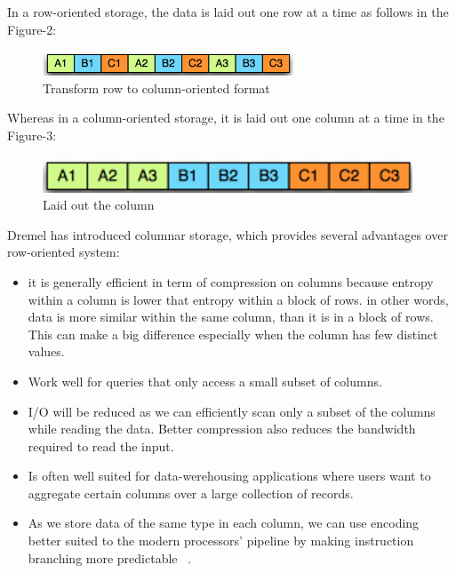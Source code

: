 \documentclass[9pt,twocolumn,twoside]{../../styles/osajnl}
\begin{document}
In a row-oriented storage, the data is laid out one row at a time as follows in the Figure-2:


\begin{figure}[H]
 \centering
\includegraphics[scale=0.7]{images/image2}
\caption{Transform row to column-oriented format}
\end{figure}

Whereas in a column-oriented storage, it is laid out one column at a time in the Figure-3:

\begin{figure}[H]
 \centering
\includegraphics[scale=0.7]{images/image3}
\caption{Laid out the column}
\end{figure}

Dremel has introduced columnar storage, which  provides several advantages over row-oriented system:

\begin{itemize}
  \item it is generally efficient in term of compression on columns because entropy within a column is lower that entropy within a block of rows. in other words, data is more similar within the same column, than it is in a block of rows. This can make a big difference especially when the column has few distinct values.
  \item Work well for queries that only access a small subset of columns. 
  \item I/O will be reduced as we can efficiently scan only a subset of the columns while reading the data. Better compression also reduces the bandwidth required to read the input.
  \item Is often well suited for data-werehousing applications where users want to aggregate certain columns over a large collection of records. 
  \item As we store data of the same type in each column, we can use encoding better suited to the modern processors’ pipeline by making instruction branching more predictable ~\cite{book-hadoop-apps}.
\end{itemize}
\end{document}
